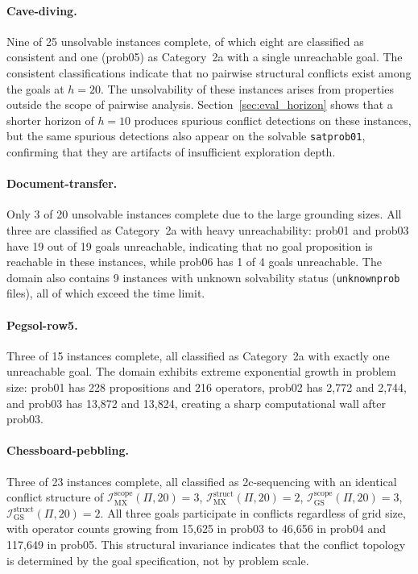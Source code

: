 \paragraph{Cave-diving.} Nine of 25 unsolvable instances complete, of which eight are classified as consistent and one (prob05) as Category~2a with a single unreachable goal. The consistent classifications indicate that no pairwise structural conflicts exist a\-mong the goals at $h = 20$. The unsolvability of these instances arises from properties outside the scope of pairwise analysis. Section~\ref{sec:eval_horizon} shows that a shorter horizon of $h = 10$ produces spurious conflict detections on these instances, but the same spurious detections also appear on the solvable \texttt{satprob01}, confirming that they are artifacts of insufficient exploration depth.

\paragraph{Document-transfer.} Only 3 of 20 unsolvable instances complete due to the large grounding sizes. All three are classified as Category~2a with heavy unreachability: prob01 and prob03 have 19 out of 19 goals unreachable, indicating that no goal proposition is reachable in these instances, while prob06 has 1 of 4 goals unreachable. The domain also contains 9 instances with unknown solvability status (\texttt{unknownprob} files), all of which exceed the time limit.

\paragraph{Pegsol-row5.} Three of 15 instances complete, all classified as Category~2a with exactly one unreachable goal. The domain exhibits extreme exponential growth in problem size: prob01 has 228 propositions and 216 operators, prob02 has 2{,}772 and 2{,}744, and prob03 has 13{,}872 and 13{,}824, creating a sharp computational wall after prob03.

\paragraph{Chessboard-pebbling.} Three of 23 instances complete, all classified as 2c-sequen\-cing with an identical conflict structure of $\mathcal{I}^{\text{scope}}_{\text{MX}}(\Pi, 20) = 3$, $\mathcal{I}^{\text{struct}}_{\text{MX}}(\Pi, 20) = 2$, $\mathcal{I}^{\text{scope}}_{\text{GS}}(\Pi, 20) = 3$, $\mathcal{I}^{\text{struct}}_{\text{GS}}(\Pi, 20) = 2$. All three goals participate in conflicts regardless of grid size, with operator counts growing from 15{,}625 in prob03 to 46{,}656 in prob04 and 117{,}649 in prob05. This structural invariance indicates that the conflict topology is determined by the goal specification, not by problem scale.

